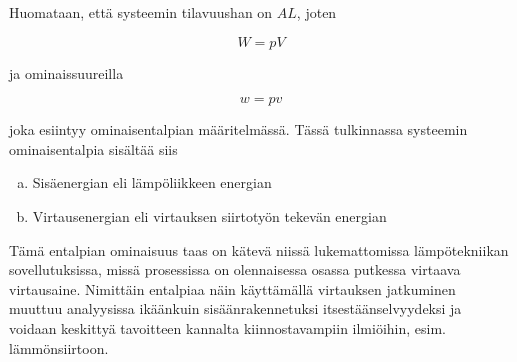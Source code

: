 \documentclass[12pt,a4paper,finnish]{book}
\begin{document}
Huomataan, että systeemin tilavuushan on $AL$, joten

\begin{equation}
 W = pV
\end{equation}

ja ominaissuureilla 

\begin{equation}
 w = pv
\end{equation}

joka esiintyy ominaisentalpian määritelmässä. Tässä tulkinnassa systeemin ominaisentalpia sisältää siis

\begin{enumerate}[a)]
 \item Sisäenergian eli lämpöliikkeen energian
 \item Virtausenergian eli virtauksen siirtotyön tekevän energian
\end{enumerate}

Tämä entalpian ominaisuus taas on kätevä niissä lukemattomissa lämpötekniikan sovellutuksissa, missä prosessissa on 
olennaisessa osassa putkessa virtaava virtausaine. Nimittäin entalpiaa näin käyttämällä virtauksen jatkuminen muuttuu 
analyysissa ikäänkuin sisäänrakennetuksi itsestäänselvyydeksi ja voidaan keskittyä tavoitteen kannalta kiinnostavampiin 
ilmiöihin, esim. lämmönsiirtoon.
\end{document}
